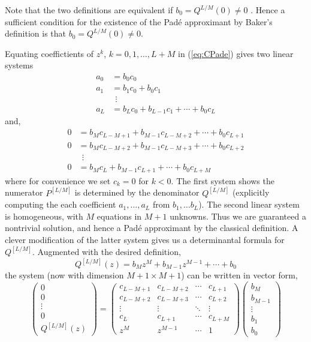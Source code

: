 Note that the two definitions are equivalent if $b_0 = Q^{L/M}(0) \neq 0$ \pn. Hence a sufficient condition for the existence of the Pad\'e approximant by Baker's definition is that $b_0 = Q^{L/M}(0) \neq 0$. 

Equating coeffictients of $z^k$, $k = 0, 1, \ldots, L+M$ in (\ref{eq:CPade}) gives two linear systems
\begin{align*}
  a_0 &= b_0c_0 \\
  a_1 &= b_1c_0 + b_0c_1 \\
  &~~\vdots \\
  a_L &= b_L c_0 + b_{L-1}c_1 + \cdots + b_0c_L
\end{align*}
and,
\begin{align*}
  0 &= b_{M}c_{L-M+1} + b_{M-1}c_{L-M+2} + \cdots + b_0c_{L+1} \\
  0 &= b_{M}c_{L-M+2} + b_{M-1}c_{L-M+3} + \cdots + b_0c_{L+2} \\
  &~~\vdots \\
  0 &= b_{M}c_L + b_{M-1}c_{L+1} + \cdots + b_0c_{L+M}
\end{align*}
where for convenience we set $c_k = 0$ for $k < 0$. The first system shows the numerator $P^{[L/M]}$ is determined by the denominator $Q^{[L/M]}$ (explicitly computing the each coefficient $a_1, \ldots, a_L$ from $b_1, \ldots b_L$). The second linear system is homogeneous, with $M$ equations in $M + 1$ unknowns. Thus we are guaranteed a nontrivial solution, and hence a Pad\'e approximant by the classical definition. A clever modification of the latter system gives us a determinantal formula for $Q^{[L/M]}$. Augmented with the desired definition, 
\[
  Q^{[L/M]}(z) = b_M z^M + b_{M-1}z^{M-1} + \cdots + b_0
\]
the system (now with dimension $M+1 \times M+1$) can be written in vector form,
\[
  \begin{pmatrix}
    0 \\ 0 \\ \vdots \\ 0 \\ Q^{[L/M]}(z)
  \end{pmatrix}
  =
  \begin{pmatrix}
    c_{L-M+1} & c_{L-M+2} & \cdots & c_{L+1} \\
    c_{L-M+2} & c_{L-M+3} & \cdots & c_{L+2} \\
    \vdots & \vdots & \ddots & \vdots \\
    c_{L} & c_{L+1} & \cdots & c_{L+M} \\
    z^M & z^{M-1} & \cdots & 1
  \end{pmatrix}
  \begin{pmatrix}
    b_M \\ b_{M-1} \\ \vdots \\ b_1 \\ b_0
  \end{pmatrix}
\]
